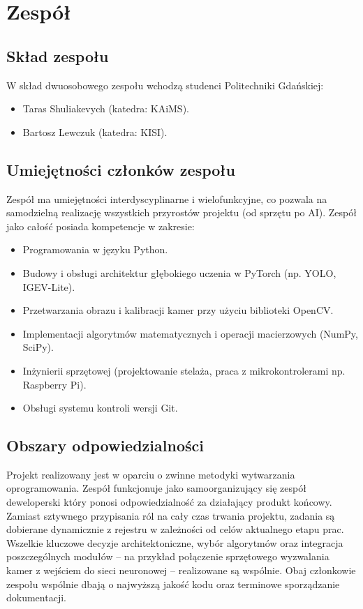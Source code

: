 \documentclass[11pt, a4paper]{article}
\begin{document}
\section{Zespół}
\subsection{Skład zespołu}
W skład dwuosobowego zespołu wchodzą studenci Politechniki Gdańskiej:
\begin{itemize}
    \item Taras Shuliakevych (katedra: KAiMS).
    \item Bartosz Lewczuk (katedra: KISI).
\end{itemize}

\subsection{Umiejętności członków zespołu}
Zespół ma umiejętności interdyscyplinarne i wielofunkcyjne, co pozwala na samodzielną realizację wszystkich przyrostów projektu (od sprzętu po AI). Zespół jako całość posiada kompetencje w zakresie:
\begin{itemize}
    \item Programowania w języku Python.
    \item Budowy i obsługi architektur głębokiego uczenia w PyTorch (np. YOLO, IGEV-Lite).
    \item Przetwarzania obrazu i kalibracji kamer przy użyciu biblioteki OpenCV.
    \item Implementacji algorytmów matematycznych i operacji macierzowych (NumPy, SciPy).
    \item Inżynierii sprzętowej (projektowanie stelaża, praca z mikrokontrolerami np. Raspberry Pi).
    \item Obsługi systemu kontroli wersji Git.
\end{itemize}

\subsection{Obszary odpowiedzialności}
Projekt realizowany jest w oparciu o zwinne metodyki wytwarzania oprogramowania. Zespół funkcjonuje jako samoorganizujący się zespół deweloperski który ponosi odpowiedzialność za działający produkt końcowy. Zamiast sztywnego przypisania ról na cały czas trwania projektu, zadania są dobierane dynamicznie z rejestru w zależności od celów aktualnego etapu prac. Wszelkie kluczowe decyzje architektoniczne, wybór algorytmów oraz integracja poszczególnych modułów – na przykład połączenie sprzętowego wyzwalania kamer z wejściem do sieci neuronowej – realizowane są wspólnie. Obaj członkowie zespołu wspólnie dbają o najwyższą jakość kodu oraz terminowe sporządzanie dokumentacji.
\end{document}
